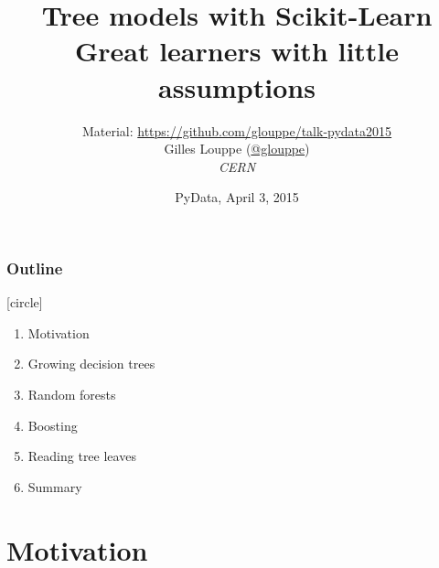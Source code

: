 \documentclass{beamer}
\title{{\bf Tree models with Scikit-Learn}\\
Great learners with little assumptions}
\author{
Material: \url{https://github.com/glouppe/talk-pydata2015}\\
\vspace{1cm}
Gilles Louppe (\href{https://twitter.com/glouppe}{@glouppe})\\
{\it CERN}
}
\date{PyData, April 3, 2015}
\begin{document}
\begin{frame}
\titlepage
\end{frame}





\begin{frame}
  \frametitle{Outline}
  [circle]
  \begin{enumerate}
  \item Motivation

  \vspace{0.5cm}

  \item Growing decision trees

  \vspace{0.5cm}

  \item Random forests

    \vspace{0.5cm}

  \item Boosting

  \vspace{0.5cm}

  \item Reading tree leaves

  \vspace{0.5cm}

  \item Summary
  \end{enumerate}
\end{frame}



\section{Motivation}
\end{document}
